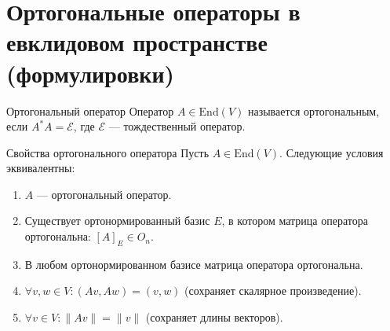 \section{Ортогональные операторы в евклидовом пространстве (формулировки)}

\begin{Definition}{Ортогональный оператор}{}
	Оператор $A \in \mathrm{End}(V)$ называется ортогональным, если $A^* A = \mathcal{E}$, где $\mathcal{E}$ — тождественный оператор.
\end{Definition}

\begin{Proposition}{Свойства ортогонального оператора}{}
	Пусть $A \in \mathrm{End}(V)$. Следующие условия эквивалентны:
	\begin{enumerate}
		\item $A$ — ортогональный оператор.
		\item Существует ортонормированный базис $E$, в котором матрица оператора ортогональна: $[A]_E \in O_n$.
		\item В любом ортонормированном базисе матрица оператора ортогональна.
		\item $\forall v, w \in V: (Av, Aw) = (v, w)$ (сохраняет скалярное произведение).
		\item $\forall v \in V: \|Av\| = \|v\|$ (сохраняет длины векторов).
	\end{enumerate}
\end{Proposition}

